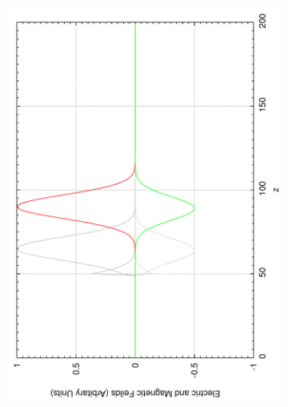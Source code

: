 \begin{figure}[ht]
        \centering
        \begin{subfigure}[ht]{0.45\textwidth}
                \centering
                \includegraphics[angle=270, width=\textwidth]{TFSF1.pdf}
        \end{subfigure}%
        ~
        \begin{subfigure}[ht]{0.45\textwidth}
                \centering

\end{subfigure}
\end{figure}
